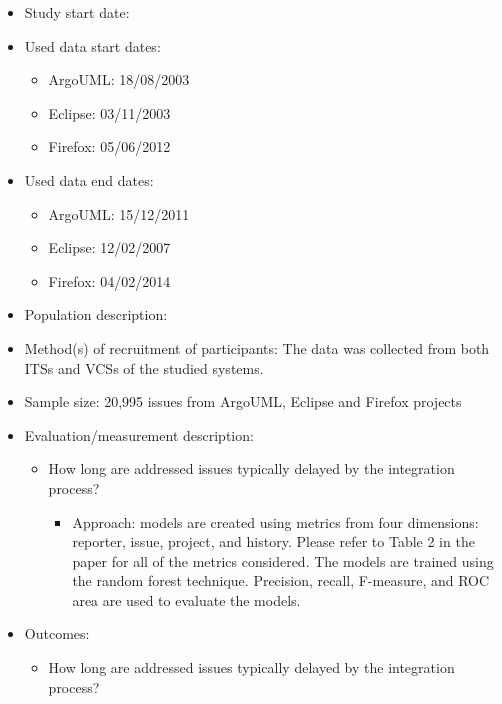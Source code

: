 \documentclass[]{book}
\providecommand{\tightlist}{%
  \setlength{\itemsep}{0pt}\setlength{\parskip}{0pt}}
\begin{document}
\begin{itemize}
\tightlist
\item
  Study start date:
\item
  Used data start dates:

  \begin{itemize}
  \tightlist
  \item
    ArgoUML: 18/08/2003
  \item
    Eclipse: 03/11/2003
  \item
    Firefox: 05/06/2012
  \end{itemize}
\item
  Used data end dates:

  \begin{itemize}
  \tightlist
  \item
    ArgoUML: 15/12/2011
  \item
    Eclipse: 12/02/2007
  \item
    Firefox: 04/02/2014
  \end{itemize}
\item
  Population description:
\item
  Method(s) of recruitment of participants: The data was collected from
  both ITSs and VCSs of the studied systems.
\item
  Sample size: 20,995 issues from ArgoUML, Eclipse and Firefox projects
\item
  Evaluation/measurement description:

  \begin{itemize}
  \tightlist
  \item
    How long are addressed issues typically delayed by the integration
    process?

    \begin{itemize}
    \tightlist
    \item
      Approach: models are created using metrics from four dimensions:
      reporter, issue, project, and history. Please refer to Table 2 in
      the paper for all of the metrics considered. The models are
      trained using the random forest technique. Precision, recall,
      F-measure, and ROC area are used to evaluate the models.
    \end{itemize}
  \end{itemize}
\item
  Outcomes:

  \begin{itemize}
  \tightlist
  \item
    How long are addressed issues typically delayed by the integration
    process?


\end{itemize}
\end{itemize}
\end{document}

